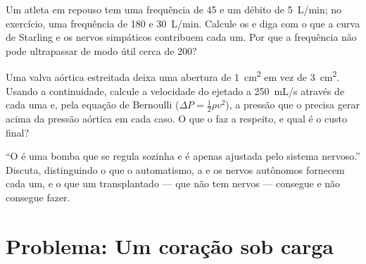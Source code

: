 \begin{exercise}[$\star\star\star$]\label{exo:b2:heart:10}
Um atleta em repouso tem uma frequência de 45 e um débito de
\qty{5}{L/min}; no exercício, uma frequência de 180 e \qty{30}{L/min}.
Calcule os  e diga com o que a curva de Starling e os
nervos simpáticos contribuem cada um. Por que a frequência não pode
ultrapassar de modo útil cerca de 200?
\end{exercise}

\begin{exercise}[$\star\star\star$]\label{exo:b2:heart:11}
Uma valva aórtica estreitada deixa uma abertura de \qty{1}{cm^2} em vez
de \qty{3}{cm^2}. Usando a continuidade, calcule a velocidade do 
ejetado a \qty{250}{mL/s} através de cada uma e, pela equação de
Bernoulli ($\Delta P = \tfrac12\rho v^2$), a pressão que o 
precisa gerar acima da pressão aórtica em cada caso. O que o 
faz a respeito, e qual é o custo final?
\end{exercise}

\begin{exercise}[$\star\star\star$]\label{exo:b2:heart:12}
``O  é uma bomba que se regula sozinha e é apenas ajustada pelo
sistema nervoso.'' Discuta, distinguindo o que o automatismo, a  e os nervos autônomos fornecem cada um, e o que um
 transplantado --- que não tem nervos --- consegue e não consegue
fazer.
\end{exercise}

\section{Problema: Um coração sob carga}

